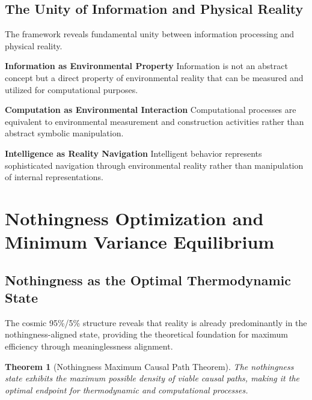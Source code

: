 \documentclass[12pt,a4paper]{article}
\newtheorem{theorem}{Theorem}
\begin{document}
\subsection{The Unity of Information and Physical Reality}

The framework reveals fundamental unity between information processing and physical reality.

\textbf{Information as Environmental Property}
Information is not an abstract concept but a direct property of environmental reality that can be measured and utilized for computational purposes.

\textbf{Computation as Environmental Interaction}
Computational processes are equivalent to environmental measurement and construction activities rather than abstract symbolic manipulation.

\textbf{Intelligence as Reality Navigation}
Intelligent behavior represents sophisticated navigation through environmental reality rather than manipulation of internal representations.

\section{Nothingness Optimization and Minimum Variance Equilibrium}

\subsection{Nothingness as the Optimal Thermodynamic State}

The cosmic 95\%/5\% structure reveals that reality is already predominantly in the nothingness-aligned state, providing the theoretical foundation for maximum efficiency through meaninglessness alignment.

\begin{theorem}[Nothingness Maximum Causal Path Theorem]
The nothingness state exhibits the maximum possible density of viable causal paths, making it the optimal endpoint for thermodynamic and computational processes.
\end{theorem}
\end{document}

